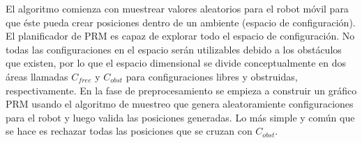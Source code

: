 El algoritmo comienza con muestrear valores aleatorios para el robot 
móvil para que éste pueda crear posiciones dentro de un ambiente (espacio
de configuración). El planificador de PRM es capaz de explorar todo el 
espacio de configuración. No todas las configuraciones en el espacio serán
utilizables debido a los obstáculos que existen, por lo que el espacio
dimensional se divide conceptualmente en dos áreas llamadas $C_{free}$ y
$C_{obst}$ para configuraciones libres y obstruidas, respectivamente. En la
fase de preprocesamiento se empieza a construir un gráfico PRM usando el 
algoritmo de muestreo que genera aleatoramiente configuraciones para el
robot y luego valida las posiciones generadas. Lo más simple y común que 
se hace es rechazar todas las posiciones que se cruzan con $C_{obst}$.




